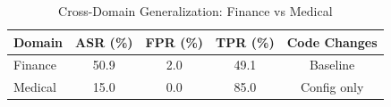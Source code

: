 \begin{table}[htbp]
\centering
\caption{Cross-Domain Generalization: Finance vs Medical}
\label{tab:crossdomain}
\begin{tabular}{lcccc}
\toprule
\textbf{Domain} & \textbf{ASR (\%)} & \textbf{FPR (\%)} & \textbf{TPR (\%)} & \textbf{Code Changes} \\
\midrule
  Finance & 50.9 & 2.0 & 49.1 & Baseline \\
  Medical & 15.0 & 0.0 & 85.0 & Config only \\
\bottomrule
\end{tabular}
\end{table}
